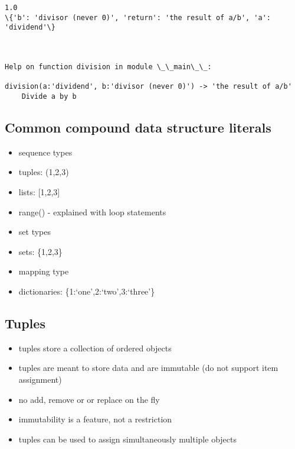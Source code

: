 \documentclass[11pt]{article}
\providecommand{\tightlist}{%
      \setlength{\itemsep}{0pt}\setlength{\parskip}{0pt}}
\begin{document}
    \begin{Verbatim}[commandchars=\\\{\}]
1.0
\{'b': 'divisor (never 0)', 'return': 'the result of a/b', 'a': 'dividend'\}



Help on function division in module \_\_main\_\_:

division(a:'dividend', b:'divisor (never 0)') -> 'the result of a/b'
    Divide a by b

    \end{Verbatim}

    \hypertarget{common-compound-data-structure-literals}{%
\subsection{Common compound data structure
literals}\label{common-compound-data-structure-literals}}

\begin{itemize}
\item
  sequence types
\item
  tuples: (1,2,3)
\item
  lists: {[}1,2,3{]}
\item
  range() - explained with loop statements
\item
  set types
\item
  sets: \{1,2,3\}
\item
  mapping type
\item
  dictionaries: \{1:`one',2:`two',3:`three'\}
\end{itemize}

    \hypertarget{tuples}{%
\subsection{Tuples}\label{tuples}}

\begin{itemize}
\tightlist
\item
  tuples store a collection of ordered objects
\item
  tuples are meant to store data and are immutable (do not support item
  assignment)
\item
  no add, remove or or replace on the fly
\item
  immutability is a feature, not a restriction
\item
  tuples can be used to assign simultaneously multiple objects
\end{itemize}
\end{document}

